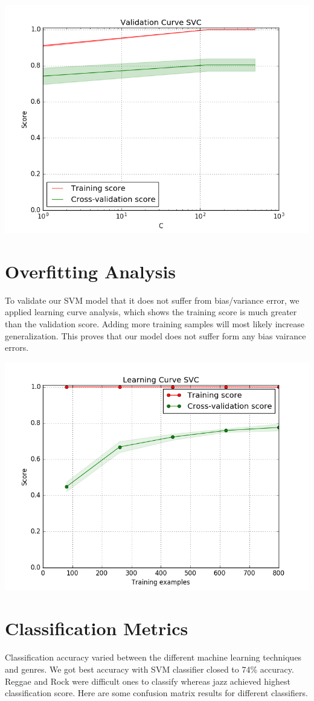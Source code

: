 \documentclass[conference]{IEEEtran}
\begin{document}
\includegraphics[width=\columnwidth]{validation}
\section{Overfitting Analysis}
To validate our SVM model that it does not suffer from bias/variance error, we applied learning curve analysis, which shows the training score is much greater than the validation score. Adding more training samples will most likely increase generalization. This proves that our model does not suffer form any bias vairance errors.

\includegraphics[width=\columnwidth]{learning}
\section{Classification Metrics}
Classification accuracy varied between the different machine learning techniques and genres. We got best accuracy with SVM classifier closed to 74\% accuracy. Reggae and Rock were difficult ones to classify whereas jazz achieved highest classification score. Here are some confusion matrix results for different classifiers.
\end{document}
